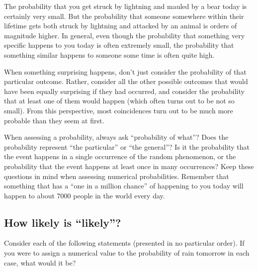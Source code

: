 \documentclass[
  letterpaper,
  DIV=11,
  numbers=noendperiod]{scrreprt}
\theoremstyle{plain}
\theoremstyle{definition}
\theoremstyle{definition}
\theoremstyle{definition}
\theoremstyle{remark}
\begin{document}
The probability that you get struck by lightning and mauled by a bear
today is certainly very small. But the probability that someone
somewhere within their lifetime gets both struck by lightning and
attacked by an animal is orders of magnitude higher. In general, even
though the probability that something very specific happens to you today
is often extremely small, the probability that something similar happens
to someone some time is often quite high.

When something surprising happens, don't just consider the probability
of that particular outcome. Rather, consider all the other possible
outcomes that would have been equally surprising if they had occurred,
and consider the probability that at least one of them would happen
(which often turns out to be not so small). From this perspective, most
coincidences turn out to be much more probable than they seem at first.

When assessing a probability, always ask ``probability of what''? Does
the probability represent ``the particular'' or ``the general''? Is it
the probability that the event happens in a single occurrence of the
random phenomenon, or the probability that the event happens at least
once in many occurrences? Keep these questions in mind when assessing
numerical probabilities. Remember that something that has a ``one in a
million chance'' of happening to you today will happen to about 7000
people in the world every day.

\subsection{How likely is ``likely''?}\label{how-likely-is-likely}

Consider each of the following statements (presented in no particular
order). If you were to assign a numerical value to the probability of
rain tomorrow in each case, what would it be?
\end{document}

